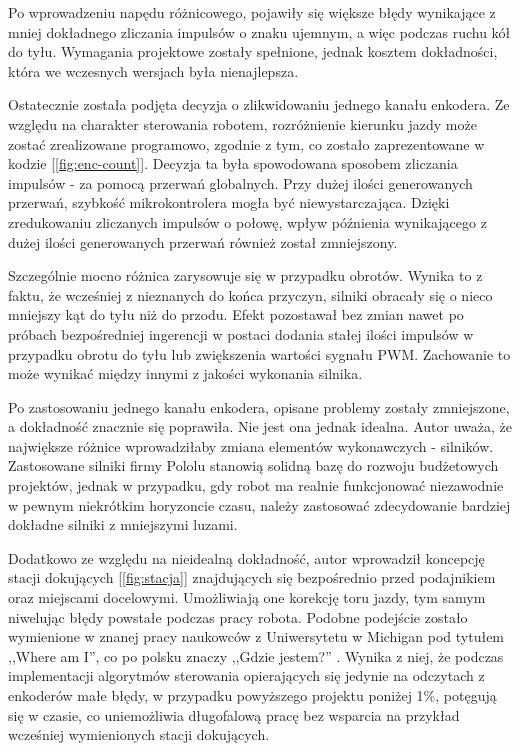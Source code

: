 Po wprowadzeniu napędu różnicowego, pojawiły się większe błędy wynikające z mniej dokładnego zliczania impulsów o znaku ujemnym, a więc podczas ruchu kół do tyłu. Wymagania projektowe zostały spełnione, jednak kosztem dokładności, która we wczesnych wersjach była nienajlepsza. 

\hspace{1cm}

Ostatecznie została podjęta decyzja o zlikwidowaniu jednego kanału enkodera. Ze względu na charakter sterowania robotem, rozróżnienie kierunku jazdy może zostać zrealizowane programowo, zgodnie z tym, co zostało zaprezentowane w kodzie [\ref{fig:enc-count}]. Decyzja ta była spowodowana sposobem zliczania impulsów - za pomocą przerwań globalnych. Przy dużej ilości generowanych przerwań, szybkość mikrokontrolera mogła być niewystarczająca. Dzięki zredukowaniu zliczanych impulsów o połowę, wpływ późnienia wynikającego z dużej ilości generowanych przerwań również został zmniejszony. 

Szczególnie mocno różnica zarysowuje się w przypadku obrotów. Wynika to z faktu, że wcześniej z nieznanych do końca przyczyn, silniki obracały się o nieco mniejszy kąt do tyłu niż do przodu. Efekt pozostawał bez zmian nawet po próbach bezpośredniej ingerencji w postaci dodania stałej ilości impulsów w przypadku obrotu do tyłu lub zwiększenia wartości sygnału PWM. Zachowanie to może wynikać między innymi z jakości wykonania silnika. 

Po zastosowaniu jednego kanału enkodera, opisane problemy zostały zmniejszone, a dokładność znacznie się poprawiła. Nie jest ona jednak idealna. Autor uważa, że największe różnice wprowadziłaby zmiana elementów wykonawczych - silników. Zastosowane silniki firmy Pololu stanowią solidną bazę do rozwoju budżetowych projektów, jednak w przypadku, gdy robot ma realnie funkcjonować niezawodnie w pewnym niekrótkim horyzoncie czasu, należy zastosować zdecydowanie bardziej dokładne silniki z mniejszymi luzami. 

\hspace{1cm}

Dodatkowo ze względu na nieidealną dokładność, autor wprowadził koncepcję stacji dokujących [\ref{fig:stacja}] znajdujących się bezpośrednio przed podajnikiem oraz miejscami docelowymi. Umożliwiają one korekcję toru jazdy, tym samym niwelując błędy powstałe podczas pracy robota. Podobne podejście zostało wymienione w znanej pracy naukowców z Uniwersytetu w Michigan pod tytułem ,,Where am I'', co po polsku znaczy ,,Gdzie jestem?'' \cite{bib:where-am-i}. Wynika z niej, że podczas implementacji algorytmów sterowania opierających się jedynie na odczytach z enkoderów małe błędy, w przypadku powyższego projektu poniżej 1\%, potęgują się w czasie, co uniemożliwia długofalową pracę bez wsparcia na przykład wcześniej wymienionych stacji dokujących.  

